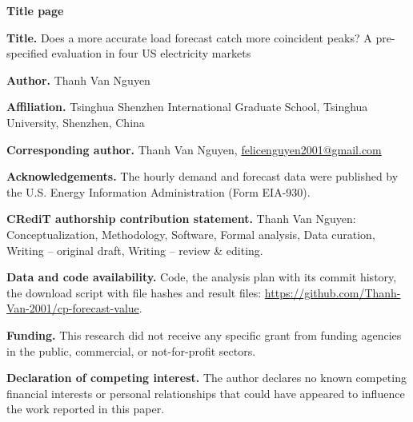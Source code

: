\documentclass[12pt]{article}
\begin{document}
\textbf{\large Title page}

\textbf{Title.} Does a more accurate load forecast catch more coincident peaks? A pre-specified evaluation in four US electricity markets

\textbf{Author.} Thanh Van Nguyen

\textbf{Affiliation.} Tsinghua Shenzhen International Graduate School, Tsinghua University, Shenzhen, China

\textbf{Corresponding author.} Thanh Van Nguyen, \href{mailto:felicenguyen2001@gmail.com}{felicenguyen2001@gmail.com}

\textbf{Acknowledgements.} The hourly demand and forecast data were published by the U.S. Energy Information Administration (Form EIA-930).

\textbf{CRediT authorship contribution statement.} Thanh Van Nguyen: Conceptualization, Methodology, Software, Formal analysis, Data curation, Writing -- original draft, Writing -- review \& editing.

\textbf{Data and code availability.} Code, the analysis plan with its commit history, the download script with file hashes and result files: \url{https://github.com/Thanh-Van-2001/cp-forecast-value}.

\textbf{Funding.} This research did not receive any specific grant from funding agencies in the public, commercial, or not-for-profit sectors.

\textbf{Declaration of competing interest.} The author declares no known competing financial interests or personal relationships that could have appeared to influence the work reported in this paper.
\end{document}
